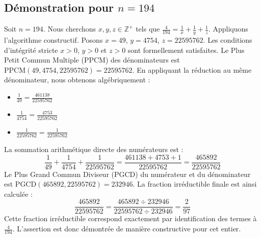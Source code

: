 \documentclass[11pt,a4paper]{article}
\begin{document}
\subsection{Démonstration pour $n = 194$}
Soit $n = 194$. Nous cherchons $x, y, z \in \mathbb{Z}^{+}$ tels que $\frac{4}{194} = \frac{1}{x} + \frac{1}{y} + \frac{1}{z}$.
Appliquons l'algorithme constructif. Posons $x = 49$, $y = 4754$, $z = 22595762$.
Les conditions d'intégrité stricte $x > 0$, $y > 0$ et $z > 0$ sont formellement satisfaites.
Le Plus Petit Commun Multiple (PPCM) des dénominateurs est $\text{PPCM}(49, 4754, 22595762) = 22595762$.
En appliquant la réduction au même dénominateur, nous obtenons algébriquement :
\begin{itemize}
    \item $\frac{1}{49} = \frac{461138}{22595762}$
    \item $\frac{1}{4754} = \frac{4753}{22595762}$
    \item $\frac{1}{22595762} = \frac{1}{22595762}$
\end{itemize}
La sommation arithmétique directe des numérateurs est :
$$ \frac{1}{49} + \frac{1}{4754} + \frac{1}{22595762} = \frac{461138 + 4753 + 1}{22595762} = \frac{465892}{22595762} $$
Le Plus Grand Commun Diviseur (PGCD) du numérateur et du dénominateur est $\text{PGCD}(465892, 22595762) = 232946$.
La fraction irréductible finale est ainsi calculée :
$$ \frac{465892}{22595762} = \frac{465892 \div 232946}{22595762 \div 232946} = \frac{2}{97} $$
Cette fraction irréductible correspond exactement par identification des termes à $\frac{4}{194}$. L'assertion est donc démontrée de manière constructive pour cet entier.
\end{document}
